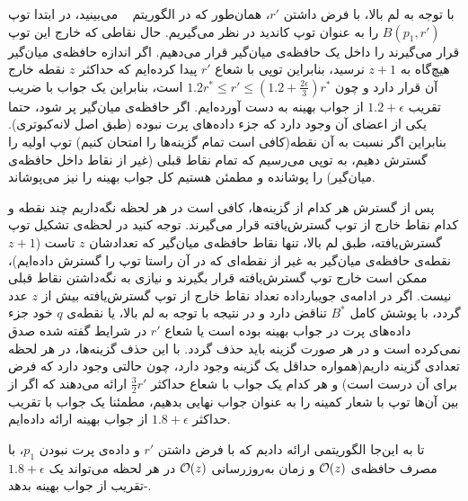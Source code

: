 با توجه به لم بالا، با فرض داشتن $r'$، همان‌طور که در الگوریتم ~ می‌بینید، در ابتدا توپ $B(p_1, r')$ را به عنوان توپ کاندید در نظر می‌گیریم. حال نقاطی که خارج این توپ قرار می‌گیرند را داخل یک حافظه‌ی میان‌گیر قرار می‌دهیم. اگر اندازه حافظه‌ی میان‌گیر هیچ‌گاه به $z+1$ نرسید، بنابراین توپی با شعاع $r'$ پیدا کرده‌ایم که حداکثر $z$ نقطه خارج آن قرار دارد و چون  $1.2r^* \leq r' \leq (1.2 + \frac{2\epsilon}{3})r^*$ است، بنابراین یک جواب با ضریب تقریب $1.2 + \epsilon$ از جواب بهینه به دست آورده‌ایم. اگر حافظه‌ی میان‌گیر پر شود، حتما یکی از اعضای آن وجود دارد که جزء داده‌های پرت نبوده (طبق‌ اصل لانه‌کبوتری). بنابراین اگر نسبت به آن نقطه‌(کافی است تمام گزینه‌ها را امتحان کنیم) توپ اولیه را گسترش دهیم، به توپی می‌رسیم که تمام نقاط قبلی (غیر از نقاط داخل حافظه‌ی میان‌گیر) را پوشانده و مطمئن هستیم کل جواب بهینه را نیز می‌پوشاند. 

پس از گسترش هر کدام از  گزینه‌ها، کافی است در هر لحظه نگه‌داریم چند نقطه و کدام نقاط خارج از توپ گسترش‌‌یافته قرار می‌گیرند. توجه کنید در لحظه‌ی تشکیل توپ گسترش‌یافته، طبق لم بالا، تنها نقاط حافظه‌ی میان‌گیر که تعدادشان $z$ تاست ($z+1$ نقطه‌ی حافظه‌ی میان‌گیر به غیر از نقطه‌ای که در آن راستا توپ را گسترش داده‌ایم)، ممکن است خارج توپ گسترش‌یافته قرار بگیرند و نیازی به نگه‌داشتن نقاط قبلی نیست. اگر در ادامه‌ی جویبارداده تعداد نقاط خارج از توپ گسترش‌یافته بیش از $z$ عدد گردد، با پوشش‌ کامل $B^*$ تناقض دارد و در نتیجه با توجه به لم بالا، یا نقطه‌ی $q$ خود جزء داده‌های پرت در جواب بهینه بوده است یا شعاع $r'$ در شرایط‌ گفته شده صدق نمی‌کرده است و در هر صورت گزینه باید حذف گردد. با این حذف گزینه‌ها، در هر لحظه تعدادی گزینه داریم(همواره حداقل یک گزینه وجود دارد، چون حالتی وجود دارد که فرض برای آن درست است) و هر کدام یک جواب با شعاع حداکثر $\frac{3}{2}r'$ ارائه می‌دهند که اگر از بین آن‌ها توپ با شعار کمینه را به عنوان جواب نهایی بدهیم، مطمئنا یک جواب با تقریب حداکثر $1.8 + \epsilon$ از جواب بهینه ارائه داده‌ایم.

تا به این‌جا الگوریتمی ارائه دادیم که با فرض داشتن $r'$ و داده‌ی پرت نبودن $p_1$، با مصرف حافظه‌ی $\mathcal{O}(z)$ و زمان به‌روزرسانی $\mathcal{O}(z)$ در هر لحظه‌ می‌تواند یک $1.8 + \epsilon$-تقریب از جواب بهینه بدهد.

